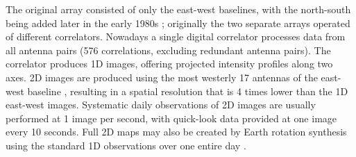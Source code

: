 {\color{blue}The original array consisted of only the east-west baselines, with the north-south being added later in the early 1980s \citep{bonmartin1983}; originally the two separate arrays operated of different correlators. Nowadays a single digital correlator processes data from all antenna pairs (576 correlations, excluding redundant antenna pairs). The correlator produces 1D images, offering projected intensity profiles along two axes. 2D images are produced using the most westerly 17 antennas of the east-west baseline \citep{kerdraon1997}, resulting in a spatial resolution that is 4 times lower than the 1D east-west images. Systematic daily observations of 2D images are usually performed at 1 image per second, with quick-look data provided at one image every 10 seconds. Full 2D maps may also be created by Earth rotation synthesis using the standard 1D observations over one entire day \citep{nrh1993, mercier2009, mercier2012}.}



